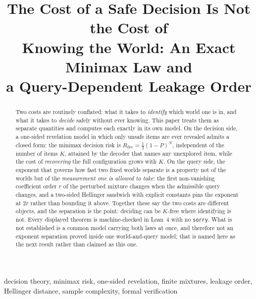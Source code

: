 



\title{The Cost of a Safe Decision Is Not the Cost of\\
Knowing the World: An Exact Minimax Law and\\
a Query-Dependent Leakage Order}

\author{
}

\maketitle

\begin{abstract}
Two costs are routinely conflated: what it takes to \emph{identify} which world one is in,
and what it takes to \emph{decide} safely without ever knowing. This paper treats them as
separate quantities and computes each exactly in its own model. On the decision side, a
one-sided revelation model in which only unsafe items are ever revealed admits a closed form:
the minimax decision risk is $R_{\mathrm{dec}}=\tfrac12(1-P)^{N}$, independent of the number
of items $K$, attained by the decoder that names any unexplored item, while the cost of
\emph{recovering} the full configuration grows with $K$. On the query side, the exponent that
governs how fast two fixed worlds separate is a property not of the worlds but of the
\emph{measurement one is allowed to take}: the first non-vanishing coefficient order $r$ of
the perturbed mixture changes when the admissible query changes, and a two-sided Hellinger
sandwich with explicit constants pins the exponent at $2r$ rather than bounding it above.
Together these say the two costs are different objects, and the separation is the point:
deciding can be $K$-free where identifying is not. Every displayed theorem is machine-checked
in Lean~4 with no \texttt{sorry}. What is not established is a common model carrying both
laws at once, and therefore not an exponent separation proved inside one world-and-query
model; that is named here as the next result rather than claimed as this one.
\end{abstract}

\begin{IEEEkeywords}
decision theory, minimax risk, one-sided revelation, finite mixtures, leakage order,
Hellinger distance, sample complexity, formal verification
\end{IEEEkeywords}

